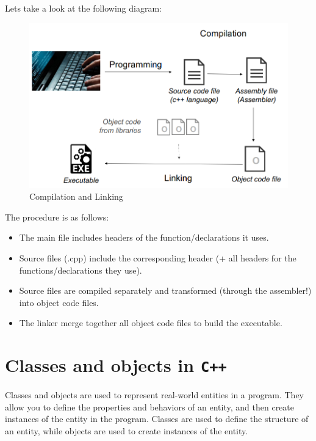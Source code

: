Lets take a look at the following diagram:

\begin{figure}[ht]
    \centering
    \includegraphics[scale=0.7]{figures/image1.png}
    \caption{Compilation and Linking}
    \label{fig:compilation_and_linking}
\end{figure}

The procedure is as follows:

\begin{itemize}
    \item The main file includes headers of the function/declarations it uses.
    \item Source files (.cpp) include the corresponding header (+ all headers for the functions/declarations they use).
    \item Source files are compiled separately and transformed (through the assembler!) into object code files.
    \item The linker merge together all object code files to build the executable.
\end{itemize}

\section{Classes and objects in \texttt{C++}}

Classes and objects are used to represent real-world entities in a program. They allow you to define the properties and
behaviors of an entity, and then create instances of the entity in the program. Classes are used to define the structure
of an entity, while objects are used to create instances of the entity.\\

